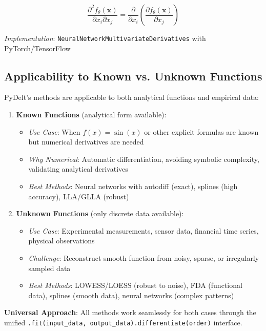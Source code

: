 \documentclass[10pt,journal,compsoc]{IEEEtran}
\begin{document}
\begin{equation}
    \frac{\partial^2 f_{\theta}(\mathbf{x})}{\partial x_i \partial x_j} = \frac{\partial}{\partial x_i}\left(\frac{\partial f_{\theta}(\mathbf{x})}{\partial x_j}\right)
\end{equation}

\textit{Implementation}: \texttt{NeuralNetworkMultivariateDerivatives} with PyTorch/TensorFlow

\subsection{Applicability to Known vs. Unknown Functions}

PyDelt's methods are applicable to both analytical functions and empirical data:

\begin{enumerate}
    \item \textbf{Known Functions} (analytical form available):
    \begin{itemize}
        \item \textit{Use Case}: When $f(x) = \sin(x)$ or other explicit formulas are known but numerical derivatives are needed
        \item \textit{Why Numerical}: Automatic differentiation, avoiding symbolic complexity, validating analytical derivatives
        \item \textit{Best Methods}: Neural networks with autodiff (exact), splines (high accuracy), LLA/GLLA (robust)
    \end{itemize}
    
    \item \textbf{Unknown Functions} (only discrete data available):
    \begin{itemize}
        \item \textit{Use Case}: Experimental measurements, sensor data, financial time series, physical observations
        \item \textit{Challenge}: Reconstruct smooth function from noisy, sparse, or irregularly sampled data
        \item \textit{Best Methods}: LOWESS/LOESS (robust to noise), FDA (functional data), splines (smooth data), neural networks (complex patterns)
    \end{itemize}
\end{enumerate}

\textbf{Universal Approach}: All methods work seamlessly for both cases through the unified \texttt{.fit(input\_data, output\_data).differentiate(order)} interface.
\end{document}
